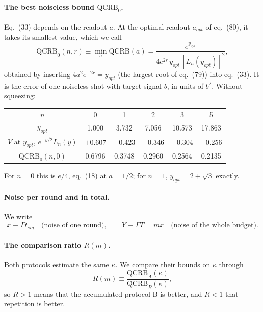 \paragraph{The best noiseless bound $\mathrm{QCRB}_0$.} Eq.~(33) depends on the readout $a$. At the optimal readout $a_{opt}$ of eq.~(80), it takes its smallest value, which we call
\begin{equation}
\label{eq:R-Q0}
    \mathrm{QCRB}_0(n, r) \equiv \min_a \mathrm{QCRB}(a) = \frac{e^{y_{opt}}}{4 e^{2r}\,y_{opt}\,[L_n(y_{opt})]^2},
\end{equation}
obtained by inserting $4a^2e^{-2r} = y_{opt}$ (the largest root of eq.~(79)) into eq.~(33). It is the error of one noiseless shot with target signal $b$, in units of $b^2$. Without squeezing:
\begin{center}
\begin{tabular}{c c c c c c}
\hline
$n$ & 0 & 1 & 2 & 3 & 5 \\
$y_{opt}$ & 1.000 & 3.732 & 7.056 & 10.573 & 17.863 \\
$V$ at $y_{opt}$, $e^{-y/2}L_n(y)$ & $+0.607$ & $-0.423$ & $+0.346$ & $-0.304$ & $-0.256$ \\
$\mathrm{QCRB}_0(n, 0)$ & 0.6796 & 0.3748 & 0.2960 & 0.2564 & 0.2135 \\
\hline
\end{tabular}
\end{center}
For $n = 0$ this is $e/4$, eq.~(18) at $a = 1/2$; for $n = 1$, $y_{opt} = 2 + \sqrt{3}$ exactly.

\paragraph{Noise per round and in total.} We write
\begin{equation}
\label{eq:R-xY}
    x \equiv \Gamma t_{sig} \quad \text{(noise of one round)},
    \qquad
    Y \equiv \Gamma T = m x \quad \text{(noise of the whole budget)}.
\end{equation}

\paragraph{The comparison ratio $R(m)$.} Both protocols estimate the same $\kappa$. We compare their bounds on $\kappa$ through
\begin{equation}
\label{eq:R-R}
    R(m) \equiv \frac{\mathrm{QCRB}_A(\kappa)}{\mathrm{QCRB}_B(\kappa)},
\end{equation}
so $R > 1$ means that the accumulated protocol B is better, and $R < 1$ that repetition is better.

